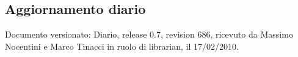 \subsection{Aggiornamento diario}
Documento versionato: Diario, release 0.7, revision 686, ricevuto da Massimo 
Nocentini e Marco Tinacci in ruolo di librarian, il 17/02/2010. 